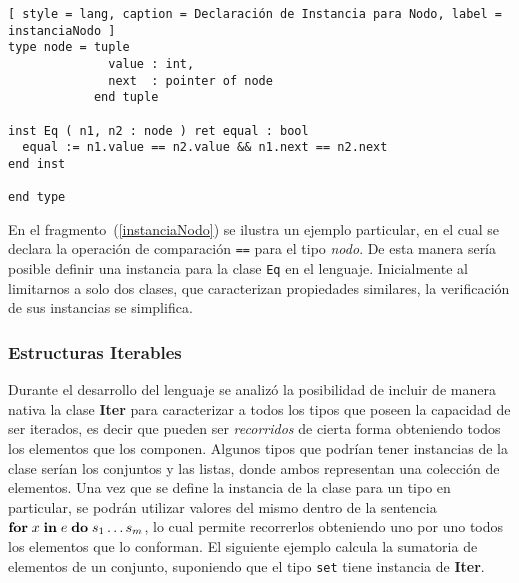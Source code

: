 \begin{lstlisting}[ style = lang, caption = Declaración de Instancia para Nodo, label = instanciaNodo ]
type node = tuple
              value : int,
              next  : pointer of node
            end tuple

inst Eq ( n1, n2 : node ) ret equal : bool
  equal := n1.value == n2.value && n1.next == n2.next
end inst

end type
\end{lstlisting}

En el fragmento~(\ref{instanciaNodo}) se ilustra un ejemplo particular, en el cual se declara la operación de comparación \lstinline[style = lang]{==} para el tipo \textit{nodo}.
De esta manera sería posible definir una instancia para la clase \lstinline[style = lang]{Eq} en el lenguaje.
Inicialmente al limitarnos a solo dos clases, que caracterizan propiedades similares, la verificación de sus instancias se simplifica.

\subsubsection{Estructuras Iterables}

Durante el desarrollo del lenguaje se analizó la posibilidad de incluir de manera nativa la clase \textbf{Iter} para caracterizar a todos los tipos que poseen la capacidad de ser iterados, es decir que pueden ser \textit{recorridos} de cierta forma obteniendo todos los elementos que los componen.
Algunos tipos que podrían tener instancias de la clase serían los conjuntos y las listas, donde ambos representan una colección de elementos.
Una vez que se define la instancia de la clase para un tipo en particular, se podrán utilizar valores del mismo dentro de la sentencia $\mathbf{for} \; x \; \mathbf{in} \; e \; \mathbf{do} \; s_{1} \ldots s_{m}$, lo cual permite recorrerlos obteniendo uno por uno todos los elementos que lo conforman.
El siguiente ejemplo calcula la sumatoria de elementos de un conjunto, suponiendo que el tipo \lstinline[style = lang]{set} tiene instancia de \textbf{Iter}.

